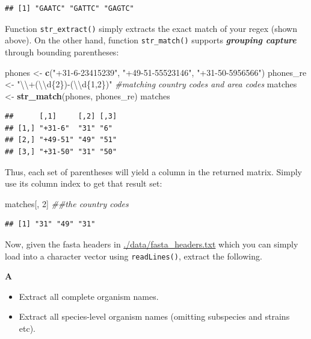 \documentclass[]{book}
\newenvironment{Shaded}{\begin{snugshade}}{\end{snugshade}}
\newcommand{\CharTok}[1]{\textcolor[rgb]{0.31,0.60,0.02}{#1}}
\newcommand{\CommentTok}[1]{\textcolor[rgb]{0.56,0.35,0.01}{\textit{#1}}}
\newcommand{\DecValTok}[1]{\textcolor[rgb]{0.00,0.00,0.81}{#1}}
\newcommand{\KeywordTok}[1]{\textcolor[rgb]{0.13,0.29,0.53}{\textbf{#1}}}
\newcommand{\NormalTok}[1]{#1}
\newcommand{\StringTok}[1]{\textcolor[rgb]{0.31,0.60,0.02}{#1}}
\providecommand{\tightlist}{%
  \setlength{\itemsep}{0pt}\setlength{\parskip}{0pt}}
\begin{document}
\begin{verbatim}
## [1] "GAATC" "GATTC" "GAGTC"
\end{verbatim}

Function \texttt{str\_extract()} simply extracts the exact match of your regex (shown above). On the other hand, function \texttt{str\_match()} supports \textbf{\emph{grouping capture}} through bounding parentheses:

\begin{Shaded}
\begin{Highlighting}[]
\NormalTok{phones <-}\StringTok{ }\KeywordTok{c}\NormalTok{(}\StringTok{"+31-6-23415239"}\NormalTok{, }\StringTok{"+49-51-55523146"}\NormalTok{, }\StringTok{"+31-50-5956566"}\NormalTok{)}
\NormalTok{phones_re <-}\StringTok{ "}\CharTok{\textbackslash{}\textbackslash{}}\StringTok{+(}\CharTok{\textbackslash{}\textbackslash{}}\StringTok{d\{2\})-(}\CharTok{\textbackslash{}\textbackslash{}}\StringTok{d\{1,2\})"} \CommentTok{#matching country codes and area codes}
\NormalTok{matches <-}\StringTok{ }\KeywordTok{str_match}\NormalTok{(phones, phones_re) }
\NormalTok{matches}
\end{Highlighting}
\end{Shaded}

\begin{verbatim}
##      [,1]     [,2] [,3]
## [1,] "+31-6"  "31" "6" 
## [2,] "+49-51" "49" "51"
## [3,] "+31-50" "31" "50"
\end{verbatim}

Thus, each set of parentheses will yield a column in the returned matrix. Simply use its column index to get that result set:

\begin{Shaded}
\begin{Highlighting}[]
\NormalTok{matches[, }\DecValTok{2}\NormalTok{] }\CommentTok{##the country codes}
\end{Highlighting}
\end{Shaded}

\begin{verbatim}
## [1] "31" "49" "31"
\end{verbatim}

Now, given the fasta headers in \url{./data/fasta_headers.txt}
which you can simply load into a character vector using \texttt{readLines()}, extract the following.

\textbf{A}

\begin{itemize}
\tightlist
\item
  Extract all complete organism names.\\
\item
  Extract all species-level organism names (omitting subspecies and strains etc).
\end{itemize}
\end{document}
